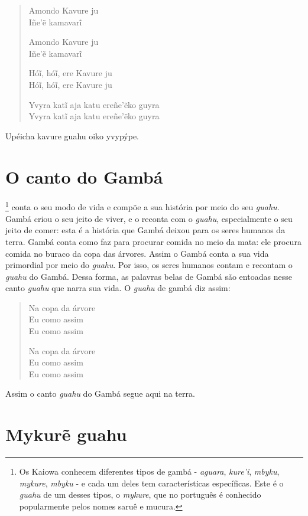 \begin{verse}
Amondo Kavure ju\\
Iñe'ẽ kamavarĩ

Amondo Kavure ju\\
Iñe'ẽ kamavarĩ

Hóĩ, hóĩ, ere Kavure ju\\
Hóĩ, hóĩ, ere Kavure ju

Yvyra katĩ aja katu ereñe'ẽko guyra\\
Yvyra katĩ aja katu ereñe'ẽko guyra
\end{verse}

Upéicha kavure guahu oiko yvypýpe.

\chapter{O canto do Gambá}

\footnote{Os Kaiowa conhecem diferentes tipos de gambá -
  \emph{aguara}, \emph{kure'i}, \emph{mbyku}, \emph{mykure},
  \emph{mbyku} - e cada um deles tem características específicas. Este é
  o \emph{guahu} de um desses tipos, o \emph{mykure}, que no português é
  conhecido popularmente pelos nomes saruê e mucura.} conta o seu modo
de vida e compõe a sua história por meio do seu \emph{guahu}. Gambá
criou o seu jeito de viver, e o reconta com o \emph{guahu},
especialmente o seu jeito de comer: esta é a história que Gambá deixou
para os seres humanos da terra. Gambá conta como faz para procurar
comida no meio da mata: ele procura comida no buraco da copa das
árvores. Assim o Gambá conta a sua vida primordial por meio do
\emph{guahu}. Por isso, os seres humanos contam e recontam o
\emph{guahu} do Gambá. Dessa forma, as palavras belas de Gambá são
entoadas nesse canto \emph{guahu} que narra sua vida. O \emph{guahu} de
gambá diz assim:

\begin{verse}
Na copa da árvore\\
Eu como assim\\
Eu como assim

Na copa da árvore\\
Eu como assim\\
Eu como assim
\end{verse}

Assim o canto \emph{guahu} do Gambá segue aqui na terra.

\chapter{Mykurẽ guahu}


